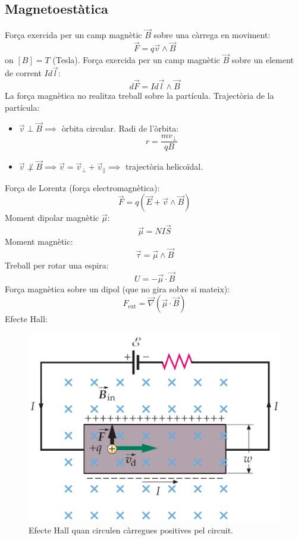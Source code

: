 \documentclass[class=article,10pt,crop=false]{standalone}
\begin{document}
\begin{multicols}{2}
\subsection{Magnetoestàtica}
Força exercida per un camp magnètic $\Vec{B}$ sobre una càrrega en moviment: $$\Vec{F}=q\Vec{v}\wedge\Vec{B}$$ {on $[B]=T$ (Tesla).}\newline
Força exercida per un camp magnètic $\Vec{B}$ sobre un element de corrent $Id\Vec{l}$: $$d\Vec{F}=Id\Vec{l}\wedge\Vec{B}$$
La força magnètica no realitza treball sobre la partícula.\newline
Trajectòria de la partícula:
\begin{itemize}
    \item $\Vec{v}\perp\Vec{B}\implies$ òrbita circular. Radi de l'òrbita:$$r=\frac{mv_\perp}{qB}$$
    \item $\Vec{v}\not\perp\Vec{B}\implies\Vec{v}=\Vec{v}_\perp+\Vec{v}_\parallel\implies$ trajectòria helicoïdal.
\end{itemize}
Força de Lorentz (força electromagnètica): $$\Vec{F}=q(\Vec{E}+\Vec{v}\wedge\Vec{B})$$
Moment dipolar magnètic $\Vec{\mu}$: $$\Vec{\mu}=NI\Vec{S}$$
Moment magnètic: $$\Vec{\tau}=\Vec{\mu}\wedge\Vec{B}$$ 
Treball per rotar una espira: $$U=-\Vec{\mu}\cdot\Vec{B}$$
Força magnètica sobre un dipol (que no gira sobre si mateix): $$F_{\text{ext}}=\Vec{\nabla}(\Vec{\mu}\cdot\Vec{B})$$
Efecte Hall:\newline
\begin{figure}[ht]
    \centering
    \includegraphics[width=\linewidth]{Physics/1st/Electricitat_i_magnetisme/Imatges/hall+.jpg}
    \caption{Efecte Hall quan circulen càrregues positives pel circuit.}

\end{figure}
\end{multicols}
\end{document}

